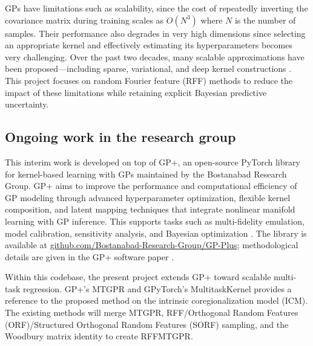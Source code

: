 \documentclass[11pt]{article}
\begin{document}
GPs have limitations such as scalability, since the cost of repeatedly inverting the covariance matrix during training scales as $O(N^3)$ where $N$ is the number of samples. Their performance also degrades in very high dimensions since selecting an appropriate kernel and effectively estimating its hyperparameters becomes very challenging.
Over the past two decades, many scalable approximations have been proposed---including sparse,
variational, and deep kernel constructions
\citep{snelson2005sparse,hensman2013svgp,deisenroth2015dgp,gal2016dropout,wilson2016deep}.
This project focuses on random Fourier feature (RFF) methods
\citep{rahimi2007rff,yu2016orf} to reduce the impact of these limitations while retaining
explicit Bayesian predictive uncertainty.

\subsection{Ongoing work in the research group}
\label{sec:group-work}

This interim work is developed on top of GP+, an open-source PyTorch library for
kernel-based learning with GPs maintained by the Bostanabad Research Group.
GP+ aims to improve the performance and computational efficiency of GP modeling through advanced
hyperparameter optimization, flexible kernel composition, and latent mapping techniques that
integrate nonlinear manifold learning with GP inference. This supports tasks such as multi-fidelity
emulation, model calibration, sensitivity analysis, and Bayesian optimization
\citep{yousefpour2024gpplus}.
The library is available at
\href{https://github.com/Bostanabad-Research-Group/GP-Plus}{github.com/Bostanabad-Research-Group/GP-Plus};
methodological details are given in the GP+ software paper
\citep{yousefpour2024gpplus}.

Within this codebase, the present project extends GP+ toward scalable multi-task regression. GP+'s MTGPR and GPyTorch's MultitaskKernel \citep{gardner2018gpytorch} provides a reference to the proposed method on the intrinsic coregionalization model (ICM). The existing methods will merge MTGPR, RFF/Orthogonal Random Features (ORF)/Structured Orthogonal Random Features (SORF) sampling, and the Woodbury matrix identity to create RFFMTGPR.
\end{document}
